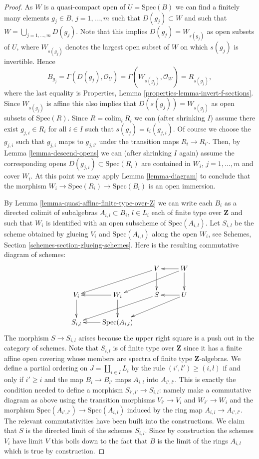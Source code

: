 \begin{proof}
\medskip\noindent
As $W$ is a quasi-compact open of $U = \text{Spec}(B)$
we can find a finitely many elements $g_j \in B$, $j = 1, \ldots, m$
such that $D(g_j) \subset W$ and such that
$W = \bigcup_{j = 1, \ldots, m} D(g_j)$.
Note that this implies $D(g_j) = W_{s(g_j)}$ as open subsets of $U$,
where $W_{s(g_j)}$ denotes the largest open subset of $W$ on which
$s(g_j)$ is invertible. Hence
$$
B_{g_j} =
\Gamma(D(g_j), \mathcal{O}_U) =
\Gamma(W_{s(g_j)}, \mathcal{O}_W) = R_{s(g_j)},
$$
where the last equality is
Properties, Lemma \ref{properties-lemma-invert-f-sections}.
Since $W_{s(g_j)}$ is affine this also
implies that $D(s(g_j)) = W_{s(g_j)}$ as open subsets of
$\text{Spec}(R)$.
Since $R = \text{colim}_i\ R_i$ we can (after shrinking $I$)
assume there exist $g_{j, i} \in R_i$ for all $i \in I$ such that
$s(g_j) = t_i(g_{j, i})$. Of course we choose the $g_{j, i}$
such that $g_{j, i}$ maps to $g_{j, i'}$ under the transition maps
$R_i \to R_{i'}$. Then, by Lemma \ref{lemma-descend-opens} we can
(after shrinking $I$ again)
assume the corresponding opens $D(g_{j, i}) \subset \text{Spec}(R_i)$
are contained in $W_i$, $j = 1, \ldots, m$ and cover $W_i$.
At this point we may apply Lemma \ref{lemma-diagram}
to conclude that the morphism
$W_i \to \text{Spec}(R_i) \to \text{Spec}(B_i)$
is an open immersion.

\medskip\noindent
By Lemma \ref{lemma-quasi-affine-finite-type-over-Z}
we can write each $B_i$ as a directed colimit of subalgebras
$A_{i, l} \subset B_i$, $l \in L_i$ each
of finite type over $\mathbf{Z}$ and such that $W_i$ is
identified with an open subscheme of $\text{Spec}(A_{i, l})$.
Let $S_{i, l}$ be the scheme obtained by glueing
$V_i$ and $\text{Spec}(A_{i, l})$ along the open $W_i$, see
Schemes, Section \ref{schemes-section-glueing-schemes}.
Here is the resulting commutative diagram of schemes:
$$
\xymatrix{
& & V \ar[lld] \ar[d] & W \ar[l] \ar[lld] \ar[d] \\
V_i \ar[d] & W_i \ar[l] \ar[d] & S \ar[lld] & U \ar[lld] \ar[l] \\
S_{i, l} & \text{Spec}(A_{i, l}) \ar[l]
}
$$
The morphism $S \to S_{i, l}$ arises because the upper right
square is a push out in the category of schemes.
Note that $S_{i, l}$ is of finite type over $\mathbf{Z}$ since
it has a finite affine open covering whose members are
spectra of finite type $\mathbf{Z}$-algebras.
We define a partial ordering on $J = \coprod_{i \in I} L_i$
by the rule $(i', l') \geq (i, l)$ if and only if
$i' \geq i$ and the map $B_i \to B_{i'}$ maps $A_{i, l}$ into
$A_{i', l'}$. This is exactly the condition needed to
define a morphism $S_{i', l'} \to S_{i, l}$: namely make a commutative
diagram as above using the transition morphisms $V_{i'} \to V_i$
and $W_{i'} \to W_i$ and
the morphism $\text{Spec}(A_{i', l'}) \to \text{Spec}(A_{i, l})$ induced
by the ring map $A_{i, l} \to A_{i', l'}$. The relevant commutativities
have been built into the constructions.
We claim that $S$ is the directed limit of the schemes $S_{i, l}$.
Since by construction the schemes $V_i$ have limit $V$ this boils
down to the fact that $B$ is the limit of the rings $A_{i, l}$
which is true by construction.
\end{proof}






